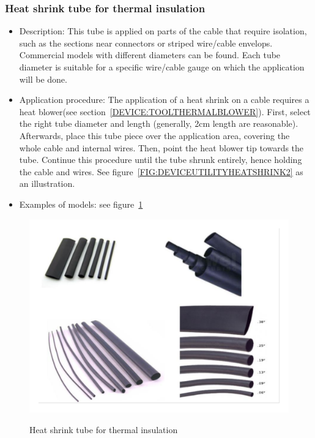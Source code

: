 \subsubsection{Heat shrink tube for thermal insulation} \label{DEVICE:TOOLTHERMALINSULATION}
\begin{itemize}
  \item Description: This tube is applied on parts of the cable that require isolation, such as the sections near connectors or striped wire/cable envelops. Commercial models with different diameters can be found. Each tube diameter is suitable for a specific wire/cable gauge on which the application will be done.
  \item Application procedure: The application of a heat shrink on a cable requires a heat blower(see section~\ref{DEVICE:TOOLTHERMALBLOWER}). First, select the right tube diameter and length (generally, 2cm length are reasonable). Afterwards, place this tube piece over the application area, covering the whole cable and internal wires. Then, point the heat blower tip towards the tube. Continue this procedure until the tube shrunk entirely, hence holding the cable and wires. See figure~\ref{FIG:DEVICEUTILITYHEATSHRINK2} as an illustration.
  \item Examples of models: see figure~\ref{FIG:DEVICEUTILITYHEATSHRINK1}
\end{itemize}
\begin{figure}
  \centering
  \includegraphics[angle=90,width=1\columnwidth]{figs/body02/FIGDEVICEUTILITYHEATSHRINK1.pdf}\\
  \caption[Heat shrink tube for thermal insulation]{Heat shrink tube for thermal insulation}
  \label{FIG:DEVICEUTILITYHEATSHRINK1}
\end{figure}

